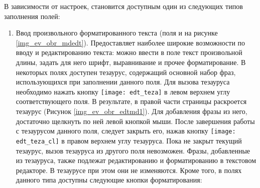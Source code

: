 В зависимости от настроек, становится доступным один из следующих типов заполнения полей:
\begin{enumerate}
 \item Ввод произвольного форматированного текста (поля  и  на рисунке \ref{img_ev_obr_mdedt}). Предоставляет наиболее широкие возможности по вводу и редактированию текста: можно ввести в поле текст произвольной длины, задать для него шрифт, выравнивание и прочее форматирование. В некоторых полях доступен тезаурус, содержащий основной набор фраз, использующихся при заполнении данного поля. Для вызова тезауруса необходимо нажать кнопку \texttt{[image: edt\_teza]} в левом верхнем углу соответствующего поля. В результате, в правой части страницы раскроется тезаурус (Рисунок \ref{img_ev_obr_edtmd1}). Для добавления фразы из него, достаточно щелкнуть по ней левой кнопкой мыши. После завершения работы с тезаурусом данного поля, следует закрыть его, нажав кнопку \texttt{[image: edt\_teza\_cl]} в правом верхнем углу тезауруса. Пока не закрыт текущий тезаурус, вызов тезауруса из другого поля невозможен. Фразы, добавленные из тезауруса, также подлежат редактированию и форматированию в текстовом редакторе. В тезаурусе при этом они не изменяются. Кроме того, в полях данного типа доступны следующие кнопки форматирования:
 

\end{enumerate}
